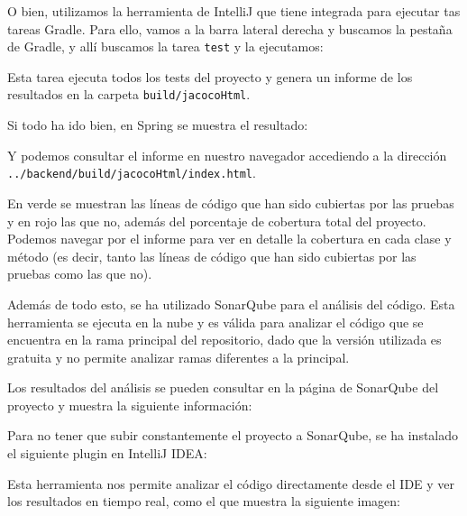 O bien, utilizamos la herramienta de IntelliJ que tiene integrada para ejecutar tas tareas Gradle.
Para ello, vamos a la barra lateral derecha y buscamos la pestaña de Gradle, y allí buscamos la tarea \texttt{test} y la ejecutamos:


Esta tarea ejecuta todos los tests del proyecto y genera un informe de los resultados en la carpeta
\texttt{build/jacocoHtml}.

Si todo ha ido bien, en Spring se muestra el resultado:


Y podemos consultar el informe en nuestro navegador accediendo a la dirección
\texttt{../backend/build/jacocoHtml/index.html}.


En verde se muestran las líneas de código que han sido cubiertas por las pruebas y en rojo las que no,
además del porcentaje de cobertura total del proyecto.
Podemos navegar por el informe para ver en detalle la cobertura en cada clase y método (es decir, tanto las líneas de
código que han sido cubiertas por las pruebas como las que no).



Además de todo esto, se ha utilizado SonarQube para el análisis del código.
Esta herramienta se ejecuta en la nube y es válida para analizar el código que se encuentra en la rama principal del
repositorio, dado que la versión utilizada es gratuita y no permite analizar ramas diferentes a la principal.

Los resultados del análisis se pueden consultar en la página de SonarQube del proyecto y muestra la siguiente información:

Para no tener que subir constantemente el proyecto a SonarQube, se ha instalado el siguiente plugin en IntelliJ IDEA:

Esta herramienta nos permite analizar el código directamente desde el IDE y ver los resultados en tiempo real, como
el que muestra la siguiente imagen:

